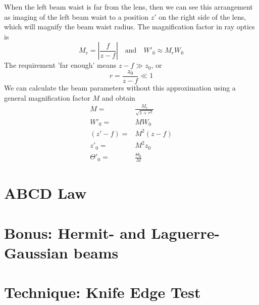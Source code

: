 When the left beam waist is far from the lens, then we can see this arrangement as imaging of the left beam waist to a position $z'$ on the right side  of the lens, which will magnify the beam waist radius. The magnification factor in ray optics is 
\begin{equation}
    M_r = \left| \frac{f}{z -f}  \right| \quad \text{and} \quad W'_0 \approx M_r W_0
\end{equation}
The requirement 'far enough' means $z-f \gg z_0$, or
\begin{equation}
    r = \frac{z_0}{z - f} \ll 1
\end{equation}
We can calculate the beam parameters without  this approximation using a general magnification factor $M$ and obtain
\begin{align}
    M = & \frac{M_r}{\sqrt{1 + r^2}} \\
    W'_0 = & M W_0 \\
    (z' - f) = &M^2 (z-f) \\
    z'_0 = & M^2 z_0 \\
    \Theta'_0 = & \frac{\Theta_0}{M}
\end{align}

\section{ABCD Law}


\section{Bonus: Hermit- and Laguerre-Gaussian beams}


\section{Technique: Knife Edge Test}





\printbibliography[segment=\therefsegment,heading=subbibliography]

